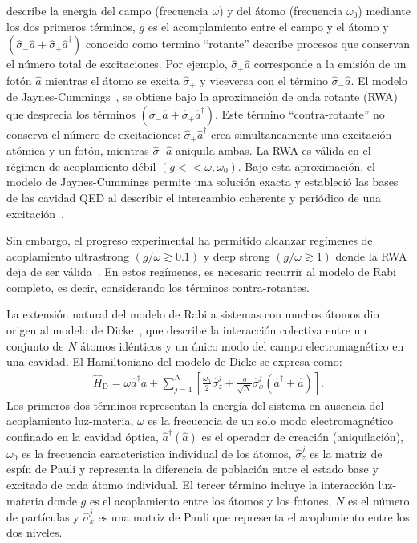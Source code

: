 \documentclass[onecolumn,notitlepage,letterpaper,aps,pra,12pt]{article}
\numberwithin{equation}{section}
\begin{document}
describe la energía del campo (frecuencia $\omega$) y del átomo (frecuencia $\omega_{0}$) mediante los dos primeros términos, $g$ es el acomplamiento entre el campo y el átomo y $(\hat{\sigma}_{-}\hat{a} + \hat{\sigma}_{+}\hat{a}^{\dagger})$ conocido como termino ``rotante'' describe procesos que conservan el número total de excitaciones. Por ejemplo, $\hat{\sigma}_{+}\hat{a}$ corresponde a la emisión de un fotón $\hat{a}$ mientras el átomo se excita $\hat{\sigma}_{+}$ y viceversa con el término $\hat{\sigma}_{-}\hat{a}$. El modelo de Jaynes-Cummings~\cite{Jaynes1963}, se obtiene bajo la aproximación de onda rotante (RWA) que desprecia los términos $(\hat{\sigma}_{-}\hat{a} + \hat{\sigma}_{+}\hat{a}^{\dagger})$. Este término  ``contra-rotante'' no conserva el número de excitaciones: $\hat{\sigma}_{+}\hat{a}^{\dagger}$ crea simultaneamente una excitación atómica y un fotón, mientras $\hat{\sigma}_{-}\hat{a}$ aniquila ambas. La RWA es válida en el régimen de acoplamiento débil $(g<<\omega,\omega_{0})$. Bajo esta aproximación, el modelo de Jaynes-Cummings permite una solución exacta y estableció las bases de las cavidad QED al describir el intercambio coherente y periódico de una excitación~\cite{wallraff2004,Schoelkopf2008,devoret2013}.

Sin embargo, el progreso experimental ha permitido alcanzar regímenes de acoplamiento ultrastrong $(g/\omega \gtrsim 0.1)$ y deep strong $(g/\omega \gtrsim 1)$ donde la RWA deja de ser válida~\cite{FornDiaz2019,Yoshihara2017}. En estos regímenes, es necesario recurrir al modelo de Rabi completo, es decir, considerando los términos contra-rotantes.

La extensión natural del modelo de Rabi a sistemas con muchos átomos dio origen al modelo de Dicke~\cite{Dicke54}, que describe la interacción colectiva entre un conjunto de $N$ átomos idénticos y un único modo del campo electromagnético en una cavidad. El Hamiltoniano del modelo de Dicke se expresa como:
\begin{gather}
    \hat{H}_{\text{D}} = \omega\hat{a}^{\dagger}\hat{a} + \sum_{j=1}^{N}\left[ \frac{\omega_{0}}{2}\hat{\sigma}_{z}^{j} + \frac{g}{\sqrt{N}}\hat{\sigma}_{x}^{j}\left(\hat{a}^{\dagger} + \hat{a}\right) \right].
\end{gather}
Los primeros dos términos representan la energía del sistema en ausencia del acoplamiento luz-materia, $\omega$ es la frecuencia de un solo modo electromagnético confinado en la cavidad óptica, $\hat{a}^{\dagger}(\hat{a})$ es el operador de creación (aniquilación), $\omega_{0}$ es la frecuencia caracteristica individual de los átomos, $\hat{\sigma}_{z}^{j}$ es la matriz de espín de Pauli  y representa la diferencia de población entre el estado base y excitado de cada átomo individual. El tercer término incluye la interacción luz-materia donde $g$ es el acoplamiento entre los átomos y los fotones,  $N$ es el número de partículas y $\hat{\sigma}_{x}^{j}$ es una matriz de Pauli que representa el acoplamiento entre los dos niveles. 
\end{document}
